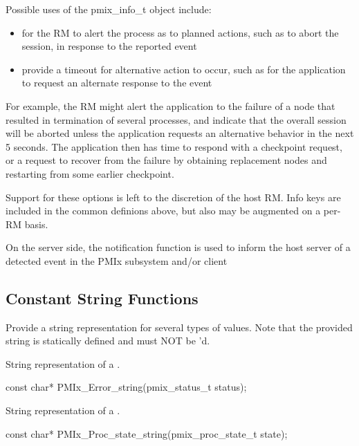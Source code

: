 \adviceuserstart
Possible uses of the pmix_info_t object include:

\begin{itemize}
\item for the RM to alert the process as to planned actions, such as to abort the session, in response to the reported event

\item provide a timeout for alternative action to occur, such as for the application to request an alternate response to the event
\end{itemize}

For example, the RM might alert the application to the failure of a node that resulted in termination of several processes, and indicate that the overall session will be aborted unless the application requests an alternative behavior in the next 5 seconds. The application then has time to respond with a checkpoint request, or a request to recover from the failure by obtaining replacement nodes and restarting from some earlier checkpoint.

Support for these options is left to the discretion of the host RM. Info keys are included in the common definions above, but also may be augmented on a per-RM basis.

On the server side, the notification function is used to inform the host server of a detected event in the PMIx subsystem and/or client
\adviceuserend


\subsection{Constant String Functions}

Provide a string representation for several types of values.
Note that the provided string is statically defined and must NOT be 'd.

\summary
{}

String representation of a .

\cspecificstart
\begin{codepar}
const char*
PMIx_Error_string(pmix_status_t status);
\end{codepar}
\cspecificend

\summary
{}

String representation of a .

\cspecificstart
\begin{codepar}
const char*
PMIx_Proc_state_string(pmix_proc_state_t state);
\end{codepar}
\cspecificend


